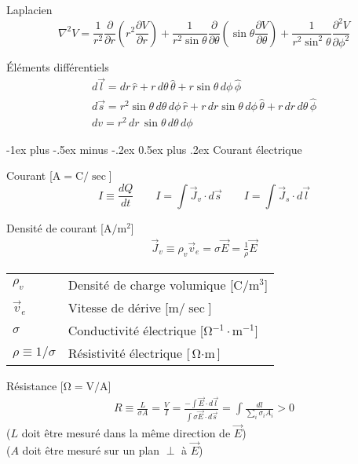 \documentclass[10pt,landscape]{article}
\makeatletter
\renewcommand{\section}{\@startsection{section}{1}{0mm}%
                                {-1ex plus -.5ex minus -.2ex}%
                                {0.5ex plus .2ex}%
                                {\normalfont\large\bfseries}}
\newcommand{\extraline}{\vspace{1em}}
\newcommand{\tableindent}{\hspace{1.5em}}
\newcommand{\uvec}[1]{\ensuremath{{\hat{#1}}}}
\makeatother
\begin{document}
\begin{multicols}{3}
Laplacien
\[ \nabla^2 V = \frac{1}{r^2} \frac{\partial}{\partial r}\left( r^2 \frac{\partial V}{\partial r} \right)
+ \frac{1}{r^2\sin\theta}\frac{\partial}{\partial \theta} \left( \sin\theta \frac{\partial V}{\partial\theta} \right)
+ \frac{1}{r^2\sin^2\theta}\frac{\partial^2 V}{\partial \phi^2} \]

Éléments différentiels
\begin{gather*}
d\vec{l} = dr\,\uvec{r} + r\,d\theta\,\uvec{\theta} + r\sin\theta\,d\phi\,\uvec{\phi} \\
d\vec{s} = r^2\sin\theta\,d\theta\,d\phi\,\uvec{r} 
+ r\,dr\sin\theta\,d\phi\,\uvec{\theta}
+ r\,dr\,d\theta\,\uvec{\phi} \\
dv = r^2\,dr\,\sin\theta\,d\theta\,d\phi
\end{gather*}


\hrulefill
\section{Courant électrique}

Courant [$\si{\ampere} = \si{\coulomb}/\si{\sec}$]
\[ I \equiv \frac{dQ}{dt}
\qquad
I =\int \vec{J}_v \cdot d\vec{s} \qquad
I = \int \vec{J}_s \cdot d\vec{l}
\]

Densité de courant [$\si{\ampere/\metre^2}$]
\begin{gather*}
\vec{J}_v \equiv \rho_v \vec{v}_e = \sigma\vec{E} = \frac{1}{\rho} \vec{E} 
\end{gather*}
%
\begin{tabular}{@{\tableindent}ll@{}}
	$\rho_v$ & Densité de charge volumique [$\si{\coulomb/\metre^3}$] \\
	$\vec{v}_e$ & Vitesse de dérive [$\si{\metre/\sec}$] \\
	$\sigma$ & Conductivité électrique [$\si{\ohm^{-1}\cdot\meter^{-1}}$] \\
	$\rho \equiv 1/\sigma$ & Résistivité électrique  [$\si{\ohm\cdot\meter}$] \\
\end{tabular}

\extraline
Résistance [$\si{\ohm} = \si{\volt/\ampere}$]
\begin{gather*}
R \equiv \frac{L}{\sigma A} = \frac{V}{I}
= \frac{-\int \vec{E}\cdot{d\vec{l}}}{\int \sigma\vec{E}\cdot{d\vec{s}}}
= \int\frac{dl}{\sum_i \sigma_i A_i} > 0
\end{gather*}
\tableindent ($L$ doit être mesuré dans la même direction de $\vec{E}$) \\
\tableindent ($A$ doit être mesuré sur un plan $\perp$ à $\vec{E}$) \\


\end{multicols}
\end{document}
